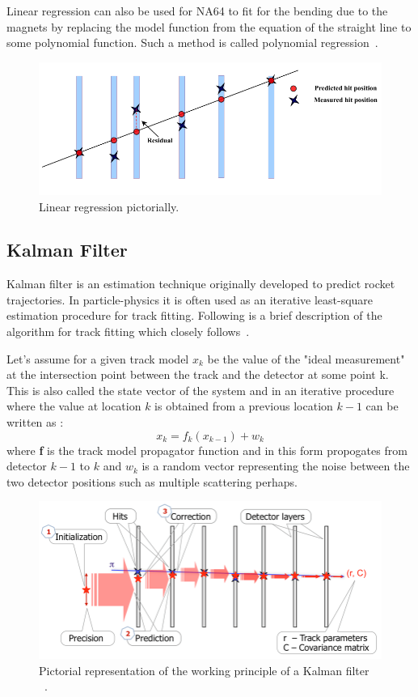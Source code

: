 Linear regression can also be used for NA64 to fit for the bending due to the magnets by replacing the model function from the equation of the straight line to some polynomial function. Such a method is called polynomial regression~\cite{STIGLER1974431}.

\begin{figure}[t!]
\centering
\includegraphics[width=\textwidth]{thesis_figures/linear_reg_new.png}
\caption{Linear regression pictorially. }
\label{fig:linear_regression}
\end{figure}

\subsection{Kalman Filter}
Kalman filter is an estimation technique originally developed to predict rocket trajectories. In particle-physics it is often used as an iterative least-square estimation procedure for track fitting. Following is a brief description of the algorithm for track fitting which closely follows~\cite{Fruhwirth:1987fm,Astier:412374}.

Let's assume for a given track model $x_k$ be the value of the "ideal measurement" at the intersection point between the track and the detector at some point k. This is also called the state vector of the system and in an iterative procedure where the value at location $k$ is obtained from a previous location $k-1$ can be written as :
\begin{equation}
  x_k = f_k(x_{k-1}) + w_k
\end{equation}
where \textbf{f} is the track model propagator function and in this form propogates from detector $k-1$ to $k$ and $w_k$ is a random vector representing the noise between the two detector positions such as multiple scattering perhaps.

\begin{figure}[t!]
\centering
\includegraphics[width=\textwidth]{thesis_figures/KALMAN.png}
\caption{Pictorial representation of the working principle of a Kalman filter ~\cite{article_KALMAN}.}
\label{fig:Kalman_filter}
\end{figure}

